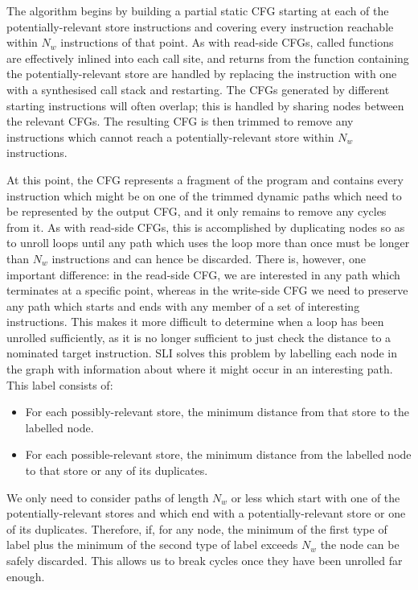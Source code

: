\documentclass[12pt,a4paper]{book}
\begin{document}
The algorithm begins by building a partial static CFG starting at each of the potentially-relevant store instructions and covering every instruction reachable within $N_w$ instructions of that point.
As with read-side CFGs, called functions are effectively inlined into each call site, and returns from the function containing the potentially-relevant store are handled by replacing the instruction with one with a synthesised call stack and restarting.
The CFGs generated by different starting instructions will often overlap; this is handled by sharing nodes between the relevant CFGs.
The resulting CFG is then trimmed to remove any instructions which cannot reach a potentially-relevant store within $N_w$ instructions.

At this point, the CFG represents a fragment of the program and contains every instruction which might be on one of the trimmed dynamic paths which need to be represented by the output CFG, and it only remains to remove any cycles from it.
As with read-side CFGs, this is accomplished by duplicating nodes so as to unroll loops until any path which uses the loop more than once must be longer than $N_w$ instructions and can hence be discarded.
There is, however, one important difference: in the read-side CFG, we are interested in any path which terminates at a specific point, whereas in the write-side CFG we need to preserve any path which starts and ends with any member of a set of interesting instructions.
This makes it more difficult to determine when a loop has been unrolled sufficiently, as it is no longer sufficient to just check the distance to a nominated target instruction.
SLI solves this problem by labelling each node in the graph with information about where it might occur in an interesting path.
This label consists of:

\begin{itemize}
\item
  For each possibly-relevant store, the minimum distance from that store to the labelled node.
\item
  For each possible-relevant store, the minimum distance from the labelled node to that store or any of its duplicates.
\end{itemize}

We only need to consider paths of length $N_w$ or less which start with one of the potentially-relevant stores and which end with a potentially-relevant store or one of its duplicates.
Therefore, if, for any node, the minimum of the first type of label plus the minimum of the second type of label exceeds $N_w$ the node can be safely discarded.
This allows us to break cycles once they have been unrolled far enough.
\end{document}
